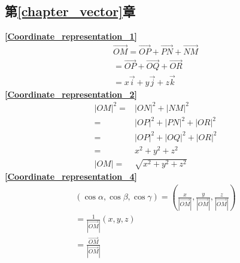 \subsection{\centering 第\ref{chapter_vector}章}
\textbf{\large \ref{Coordinate_representation_1}}
\begin{align*}
	\overrightarrow{OM}=\overrightarrow{OP}+\overrightarrow{PN}+\overrightarrow{NM}\\
	=\overrightarrow{OP}+\overrightarrow{OQ}+\overrightarrow{OR}\\
	=x\overrightarrow{i}+y\overrightarrow{j}+z\overrightarrow{k}
\end{align*}
\textbf{\large \ref{Coordinate_representation_2}}
\begin{align*}
	|OM|^2=&|ON|^2+|NM|^2\\
	=&|OP|^2+|PN|^2+|OR|^2\\
	=&|OP|^2+|OQ|^2+|OR|^2\\
	=&x^2+y^2+z^2\\
	|OM|=&\sqrt{x^2+y^2+z^2}
\end{align*}
\textbf{\large \ref{Coordinate_representation_4}}
\begin{align*}
			(\cos\alpha,\cos\beta,\cos\gamma)=(\frac{x}{|\overrightarrow{OM}|},\frac{y}{|\overrightarrow{OM}|},\frac{z}{|\overrightarrow{OM}|})\\
			=\frac{1}{|\overrightarrow{OM}|}(x,y,z)\\
			=\frac{\overrightarrow{OM}}{|\overrightarrow{OM}|}
\end{align*}
